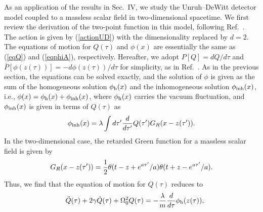 \documentclass[aps,prd,preprintnumbers,nofootinbib,showpacs]{revtex4}%
\begin{document}
\begin{widetext}
As an application of the results in Sec.~IV, we study 
the Unruh--DeWitt detector model coupled to a massless scalar field in two-dimensional spacetime. 
We first review the derivation of the two-point function in this model, following Ref.~\cite{HuRaval}. 
The action is given by (\ref{actionUD}) with the dimensionality replaced by $d=2.$
The equations of motion for $Q(\tau)$ and $\phi(x)$ are essentially the same as 
(\ref{eqQ}) and (\ref{eqphiA}), respectively. 
Hereafter, we adopt $P[Q]={dQ/d\tau}$ and $\bar P[\phi(z(\tau))]=-{d\phi(z(\tau))/d\tau}$
for simplicity, as in Ref.~\cite{HuRaval}.
As in the previous section, the equations can be solved exactly, and 
the solution of $\phi$ is given as the sum of the homogeneous solution $\phi_{\rm h}(x)$ and the 
inhomogeneous solution $\phi_{\rm inh}(x)$, i.e.,
$  \phi(x)=\phi_{\rm h}(x)+\phi_{\rm inh}(x)$,
where $\phi_{\rm h}(x)$ carries the vacuum fluctuation, and $\phi_{\rm inh}(x)$ is given 
in terms of $Q(\tau)$ as
\begin{eqnarray}
\phi_{\rm inh}(x) =\lambda \int d\tau' {d\over d\tau'}Q(\tau')G_R(x-z(\tau')).
\label{phiQG2}
\end{eqnarray}
In the two-dimensional case, the retarded Green function for a massless scalar field is given by
\begin{eqnarray}
G_R(x-z(\tau'))={1\over 2}\theta(t-z+e^{a\tau'}/a)\theta(t+z-e^{a\tau'}/a).
\label{RGF2}
\end{eqnarray}
Thus, we find that the equation of motion for $Q(\tau)$ reduces to 
\begin{eqnarray}
&&\ddot Q(\tau)+2\gamma\dot Q(\tau)+\Omega_0^2Q(\tau)
=-{\lambda\over m}{d\over d\tau}\phi_{\rm h}(z(\tau)),
\label{eqQ2b}
\end{eqnarray}

\end{widetext}
\end{document}
